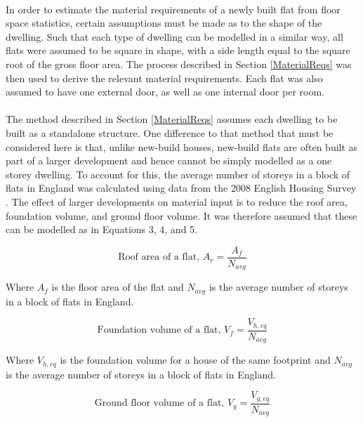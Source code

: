\documentclass[12pt]{article}
\begin{document}
\paragraph{}
In order to estimate the material requirements of a newly built flat from floor space statistics, certain assumptions must be made as to the shape of the dwelling. Such that each type of dwelling can be modelled in a similar way, all flats were assumed to be square in shape, with a side length equal to the square root of the gross floor area. The process described in Section \ref{MaterialReqs} was then used to derive the relevant material requirements. Each flat was also assumed to have one external door, as well as one internal door per room.

\paragraph{}
The method described in Section \ref{MaterialReqs} assumes each dwelling to be built as a standalone structure. One difference to that method that must be considered here is that, unlike new-build houses, new-build flats are often built as part of a larger development and hence cannot be simply modelled as a one storey dwelling. To account for this, the average number of storeys in a block of flats in England was calculated using data from the 2008 English Housing Survey \citep{Ministry_of_Housing_Communities_and_Local_Government2017-xx}. The effect of larger developments on material input is to reduce the roof area, foundation volume, and ground floor volume. It was therefore assumed that these can be modelled as in Equations 3, 4, and 5. 

\begin{equation}
    \text{Roof area of a flat, } A_r = \frac{A_f}{N_{avg}}
\end{equation}

\noindent
Where $A_f$ is the floor area of the flat and $N_{avg}$ is the average number of storeys in a block of flats in England. 

\begin{equation}
    \text{Foundation volume of a flat, } V_f = \frac{V_{h,eq}}{N_{avg}}
\end{equation}

\noindent
Where $V_{h,eq}$ is the foundation volume for a house of the same footprint and $N_{avg}$ is the average number of storeys in a block of flats in England. 

\begin{equation}
    \text{Ground floor volume of a flat, } V_g = \frac{V_{g,eq}}{N_{avg}}
\end{equation}
\end{document}
